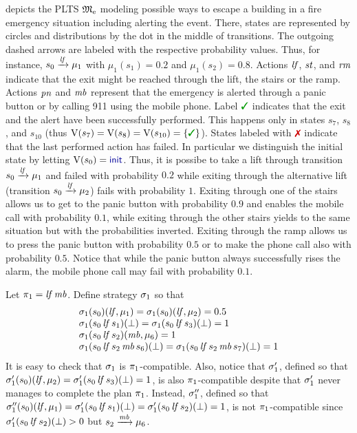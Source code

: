 \begin{example}[Running]\label{ex:running}
   depicts the PLTS ${\mathfrak{M}}_{\mathrm{e}}$ modeling
  possible ways to escape a building in a fire emergency situation
  including alerting the event.  There, states are represented by
  circles and distributions by the dot in the middle of transitions.
  The outgoing dashed arrows are labeled with the respective
  probability values.  Thus, for instance, $s_0\xrightarrow{\mathit{lf}}\mu_1$
  with $\mu_1(s_1)=0.2$ and $\mu_1(s_2)=0.8$.
  Actions $\mathit{lf}$, $\mathit{st}$, and $\mathit{rm}$ indicate that the exit might
  be reached through the lift, the stairs or the ramp.  Actions
  $\mathit{pn}$ and $\mathit{mb}$ represent that the emergency is alerted
  through a panic button or by calling 911 using the mobile phone.
  Label $\goal$ indicates that the exit and the alert have been
  successfully performed.  This happens only in states $s_7$, $s_8$,
  and $s_{10}$ (thus $\V(s_7)=\V(s_8)=\V(s_{10})=\{\goal\}$).  States
  labeled with $\fail$ indicate that the last performed action has
  failed.  In particular we distinguish the initial state by letting
  $\V(s_0)=\init$.
  Thus, it is possibe to take a lift through transition
  $s_0\xrightarrow{\mathit{lf}}\mu_1$ and failed with probability $0.2$ while
  exiting through the alternative lift (transition
  $s_0\xrightarrow{\mathit{lf}}\mu_2$) fails with probability $1$.
  Exiting through one of the stairs allows us to get to the panic
  button with probability $0.9$ and enables the mobile call with
  probability $0.1$, while exiting through the other stairs yields to
  the same situation but with the probabilities inverted.  Exiting
  through the ramp allows us to press the panic button with
  probability $0.5$ or to make the phone call also with probability
  $0.5$.
  Notice that while the panic button always successfully rises the
  alarm, the mobile phone call may fail with probability $0.1$.

  Let $\pi_1 = \mathit{lf}\,\mathit{mb}$.  Define strategy $\sigma_1$ so that
  \[
  \begin{array}{l}
    \sigma_1(s_0)(\mathit{lf},\mu_1)=\sigma_1(s_0)(\mathit{lf},\mu_2)=0.5\\
    \sigma_1(s_0\,\mathit{lf}\,s_1)(\bot)=\sigma_1(s_0\,\mathit{lf}\,s_3)(\bot)=1\\
    \sigma_1(s_0\,\mathit{lf}\,s_2)(\mathit{mb},\mu_6)=1\\
    \sigma_1(s_0\,\mathit{lf}\,s_2\,\mathit{mb}\,s_6)(\bot)=
    \sigma_1(s_0\,\mathit{lf}\,s_2\,\mathit{mb}\,s_7)(\bot)=1
  \end{array}
  \]
  It is easy to check that $\sigma_1$ is $\pi_1$-compatible.
  Also, notice that $\sigma'_1$, defined so that
  $\sigma'_1(s_0)(\mathit{lf},\mu_2)=\sigma'_1(s_0\,\mathit{lf}\,s_3)(\bot)=1$,
  is also $\pi_1$-compatible despite that $\sigma'_1$ never manages to
  complete the plan $\pi_1$.
  Instead, $\sigma''_1$, defined so that
  $\sigma''_1(s_0)(\mathit{lf},\mu_1)=\sigma'_1(s_0\,\mathit{lf}\,s_1)(\bot)=\sigma'_1(s_0\,\mathit{lf}\,s_2)(\bot)=1$,
  is not $\pi_1$-compatible since
  $\sigma'_1(s_0\,\mathit{lf}\,s_2)(\bot)>0$ but
  ${s_2\xrightarrow{\mathit{mb}}\mu_6}$.
\end{example}


